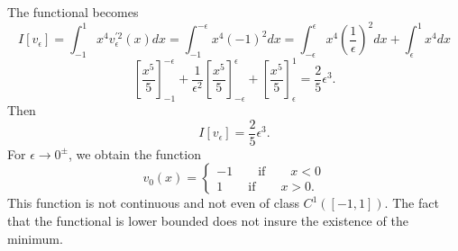 \documentclass[a4paper, twoside, openany]{book}
\begin{document}
The functional becomes
$$I[v_{\epsilon}] = \int_{-1}^1 x^4 v_{\epsilon}^{'2}(x) dx = \int_{-1}^{-\epsilon} x^4 (-1)^2 dx = \int_{-\epsilon}^{\epsilon} x^4 (\frac{1}{\epsilon})^2 dx + \int_{\epsilon}^1 x^4 dx $$
$$[\frac{x^5}{5}]_{-1}^{-\epsilon} + \frac{1}{\epsilon^2}[\frac{x^5}{5}]_{-\epsilon}^{\epsilon} + [\frac{x^5}{5}]_{\epsilon}^1 = \frac{2}{5} \epsilon^3.$$
Then
$$I[v_{\epsilon}] = \frac{2}{5}\epsilon^3.$$
For $\epsilon \rightarrow 0^{\pm}$, we obtain the function
$$v_0(x) = \begin{cases}
				-1 \qquad \textrm{if} \qquad x < 0 \\
				1 \qquad \textrm{if} \qquad x > 0.
		   \end{cases}$$
This function is not continuous and not even of class $C^1([-1, 1])$. The fact that the functional is lower bounded does not insure the existence of the minimum.
\clearpage
\end{document}
